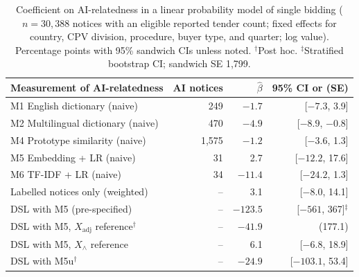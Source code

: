 \documentclass[runningheads]{llncs}
\begin{document}
\begin{table}[t]
\caption{Coefficient on AI-relatedness in a linear probability model of single bidding ($n=30{,}388$ notices with an eligible reported tender count; fixed effects for country, CPV division, procedure, buyer type, and quarter; log value). Percentage points with 95\% sandwich CIs unless noted. $^\dagger$Post hoc. $^\ddagger$Stratified bootstrap CI; sandwich SE 1,799.}\label{tab:reg}
\centering
\begin{tabular}{lrrr}
\toprule
Measurement of AI-relatedness & AI notices & $\hat\beta$ & 95\% CI or (SE) \\
\midrule
M1 English dictionary (naive) & 249 & $-1.7$ & [$-7.3$, 3.9] \\
M2 Multilingual dictionary (naive) & 470 & $-4.9$ & [$-8.9$, $-0.8$] \\
M4 Prototype similarity (naive) & 1,575 & $-1.2$ & [$-3.6$, 1.3] \\
M5 Embedding + LR (naive) & 31 & 2.7 & [$-12.2$, 17.6] \\
M6 TF-IDF + LR (naive) & 34 & $-11.4$ & [$-24.2$, 1.3] \\
Labelled notices only (weighted) & -- & 3.1 & [$-8.0$, 14.1] \\
DSL with M5 (pre-specified) & -- & $-123.5$ & [$-561$, 367]$^\ddagger$ \\
DSL with M5, $X_{\mathrm{adj}}$ reference$^\dagger$ & -- & $-41.9$ & (177.1) \\
DSL with M5, $X_\wedge$ reference & -- & 6.1 & [$-6.8$, 18.9] \\
DSL with M5u$^\dagger$ & -- & $-24.9$ & [$-103.1$, 53.4] \\
\bottomrule
\end{tabular}
\end{table}
\end{document}
